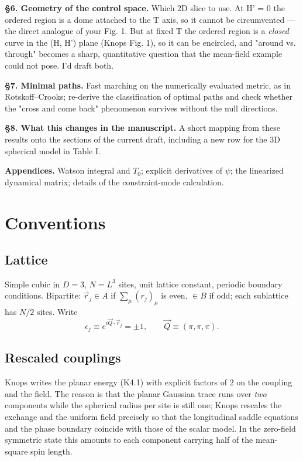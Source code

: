 \documentclass[11pt,a4paper]{article}
\newcommand{\bQ}{\vec Q}
\newcommand{\brr}{\vec r}
\newcommand{\bQ}{\vec Q}
\begin{document}
\textbf{§6. Geometry of the control space.} Which 2D slice to use. At H' = 0 the ordered region is a dome attached to the T axis, so it cannot be circumvented — the direct analogue of your Fig. 1. But at fixed T the ordered region is a \textit{closed} curve in the (H, H') plane (Knops Fig. 1), so it can be encircled, and "around vs. through" becomes a sharp, quantitative question that the mean-field example could not pose. I'd draft both.

\textbf{§7. Minimal paths.} Fast marching on the numerically evaluated metric, as in Rotskoff–Crooks; re-derive the classification of optimal paths and check whether the "cross and come back" phenomenon survives without the null directions.

\textbf{§8. What this changes in the manuscript.} A short mapping from these results onto the sections of the current draft, including a new row for the 3D spherical model in Table I.

\textbf{Appendices.} Watson integral and $T_0$; explicit derivatives of $\psi$; the linearized dynamical matrix; details of the constraint-mode calculation.



\section{Conventions}

\subsection{Lattice}
Simple cubic in $D=3$, $N=L^3$ sites, unit lattice constant, periodic boundary conditions.
Bipartite: $\brr_j\in A$ if $\sum_\mu(r_j)_\mu$ is even, $\in B$ if odd; each sublattice has
$N/2$ sites. Write
\begin{equation}
  \epsilon_j\equiv e^{i\bQ\cdot\brr_j}=\pm1,\qquad \bQ\equiv(\pi,\pi,\pi).
\end{equation}

\subsection{Rescaled couplings}
\label{sec:rescale}
Knops writes the planar energy (K4.1) with explicit factors of $2$ on the coupling and the
field. The reason is that the planar Gaussian trace runs over \emph{two} components while
the spherical radius per site is still one; Knops rescales the exchange and the uniform
field precisely so that the longitudinal saddle equations and the phase boundary coincide
with those of the scalar model. In the zero-field symmetric state this amounts to each
component carrying half of the mean-square spin length.
\end{document}
